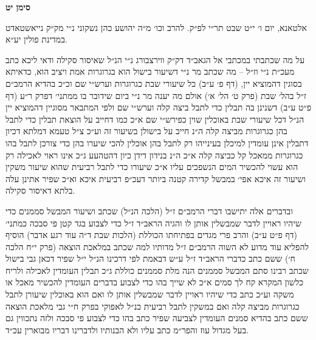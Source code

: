 \documentclass[12pt, openany]{book}
\newcommand{\chapname}{}
\newcommand{\newchap}[1]{
	\addcontentsline{toc}{chapter}{#1}
	\renewcommand{\chapname}{#1}
		\begin{center}
			\textbf{%
\fontsize{16pt}{16pt}\selectfont
				#1}
		\end{center}
}
\begin{document}
\newchap{סימן יט}
\begin{multicols}{2}
אלטאנא, יום ו׳ י״ט שבט תר״י לפ״ק. להרב וכו׳ מ״ה יהושע כהן נשקוני נ״י מק״ק נייאשטאדט במדינת פולין יע״א.\\\vspace{0pt}

על מה שכתבתי במכתבי אל הגאב״ד דק״ק ווירצבורג נ״י הנ״ל שאיסור סקילה ודאי ליכא כתב מעכ״ת נ״י וז״ל – מה שכתב מר נ״י דשיעור בישול הוא בגרוגרות אמת ויציב הוא, כדאיתא בסוגין דהמוציא יין, (דף פ׳ ע״ב) כל שיעורי שבת כגרוגרות וערש״י שם וכ״כ בהדיא הרמב״ם ז״ל בהל׳ שבת (פרק ט׳ הל׳ א׳) אולם מה יענה מר נ״י ביום שידובר בו ממתני׳ דפרק ר״ע (דף פ״ט ע״ב) דשנינן בה תבלין כדי לתבל ביצה קלה וערש״י שם ולפי המתבאר מסוגיין דהמוציא יין הנ״ל דכל שיעורי שבת באוכלין שוין כפירש״י שם א״כ כמו דחייב על הוצאת תבלין כדי לתבל בהן כגרוגרות מביצה קלה ה״נ חייב על בישולן בשיעור זה וע״כ צ״ל טעמא דמלתא דכיון דתבלין אינן עומדין למיכלן בעינייהו רק לתבל בהן אוכלין להכי שיערו בהן כדי צורכן לתבל בהו כגרוגרות ממאכל קל כביצה קלה א״כ ה״נ בנידון דידן כיון דהטהעע ג״כ אינו ראוי לאכילה רק הוא עשוי להכשיר המים הנשפכים עליו א״כ שיעורו כדי לתבל רביעית שהוא שיעור משקין ושיעור זה איכא אפי׳ במבשל קדירה קטנה ביותר דעכ״פ רביעית איכא וא״כ שפיר אתינן עלה בלתא דאיסור סקילה.\\\vspace{0pt}

ובדברים אלה יתישבו דברי הרמב״ם ז״ל (הלכה הנ״ל) שכתב ושיעור המבשל סממנים כדי שיהיו ראויין לדבר שמבשלין אותן לו והגיה הראב״ד ז״ל כדי לצבוע בגד קטן פי סבכה כמתני׳ (דף פ״ט ע״ב) והרב פרי מגדים בפתיחתו הכוללת (הלכות שבת ד״ה עוד רגע אדבר) הוסיף להפליא עוד מדוע לא השוה הרמב״ם ז״ל מדותיו למה שכתב במלאכת הוצאה (פרק י״ח הלכה ח׳) ששם כתב כדברי הראב״ד ז״ל ע״ש דבאמת לפי דרכינו הנ״ל י״ל שפיר דכאן גבי בישול שכתב רבינו סתם המבשל סממנים הנה מלת סממנים כוללת ג״כ תבלין העומדין לאכילה ולריח כלשון המקרא קח לך סמים א״כ לא שייך בהו כדי לצבוע בדברים העומדין להכשיר מאכל או משקה וע״כ כתב כדי שיהיו ראויין לדבר שמבשלין אותן לו ואם הוא באוכלין שיעורן לתבל כגרוגרות מביצה קלה ואם במשקין לתבל רביעית כנ״ל לאפוקי בפרק ח״י גבי מלאכת הוצאה ששם כתב בהדיא סמנים העומדין לצביעה שפיר כתב בהו כדי לצבוע פי סבכה ולזה נתכווין גם בעל מגדול עוז והפר״מ כתב עליו ולא הבנותיו ולדברינו דבריו מבוארין עכ״ד.\\\vspace{0pt}


\end{multicols}
\end{document}
